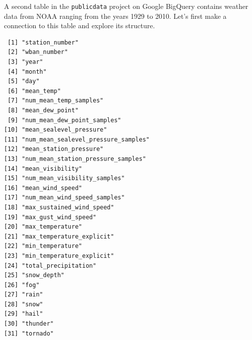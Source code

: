 \documentclass[]{krantz}
\makeatletter
\newenvironment{Shaded}{\begin{snugshade}}{\end{snugshade}}
\newcommand{\KeywordTok}[1]{\textcolor[rgb]{0.27,0.27,0.27}{\textbf{#1}}}
\newcommand{\DecValTok}[1]{\textcolor[rgb]{0.06,0.06,0.06}{#1}}
\newcommand{\StringTok}[1]{\textcolor[rgb]{0.5,0.5,0.5}{#1}}
\newcommand{\OperatorTok}[1]{\textcolor[rgb]{0.43,0.43,0.43}{\textbf{#1}}}
\newcommand{\NormalTok}[1]{#1}
\newenvironment{kframe}{%
\medskip{}
\setlength{\fboxsep}{.8em}
 \def\at@end@of@kframe{}%
 \ifinner\ifhmode%
  \def\at@end@of@kframe{\end{minipage}}%
  \begin{minipage}{\columnwidth}%
 \fi\fi%
 \def\FrameCommand##1{\hskip\@totalleftmargin \hskip-\fboxsep
 \colorbox{shadecolor}{##1}\hskip-\fboxsep
     \hskip-\linewidth \hskip-\@totalleftmargin \hskip\columnwidth}%
 \MakeFramed {\advance\hsize-\width
   \@totalleftmargin\z@ \linewidth\hsize
   \@setminipage}}%
 {\par\unskip\endMakeFramed%
 \at@end@of@kframe}
\renewenvironment{Shaded}{\begin{kframe}}{\end{kframe}}
\makeatother
\begin{document}
A second table in the \texttt{publicdata} project on Google BigQuery
contains weather data from NOAA ranging from the years 1929 to 2010.
Let's first make a connection to this table and explore its structure.

\begin{Shaded}
\end{Shaded}

\begin{verbatim}
 [1] "station_number"                    
 [2] "wban_number"                       
 [3] "year"                              
 [4] "month"                             
 [5] "day"                               
 [6] "mean_temp"                         
 [7] "num_mean_temp_samples"             
 [8] "mean_dew_point"                    
 [9] "num_mean_dew_point_samples"        
[10] "mean_sealevel_pressure"            
[11] "num_mean_sealevel_pressure_samples"
[12] "mean_station_pressure"             
[13] "num_mean_station_pressure_samples" 
[14] "mean_visibility"                   
[15] "num_mean_visibility_samples"       
[16] "mean_wind_speed"                   
[17] "num_mean_wind_speed_samples"       
[18] "max_sustained_wind_speed"          
[19] "max_gust_wind_speed"               
[20] "max_temperature"                   
[21] "max_temperature_explicit"          
[22] "min_temperature"                   
[23] "min_temperature_explicit"          
[24] "total_precipitation"               
[25] "snow_depth"                        
[26] "fog"                               
[27] "rain"                              
[28] "snow"                              
[29] "hail"                              
[30] "thunder"                           
[31] "tornado"                           
\end{verbatim}

\begin{Shaded}
\end{Shaded}
\end{document}
